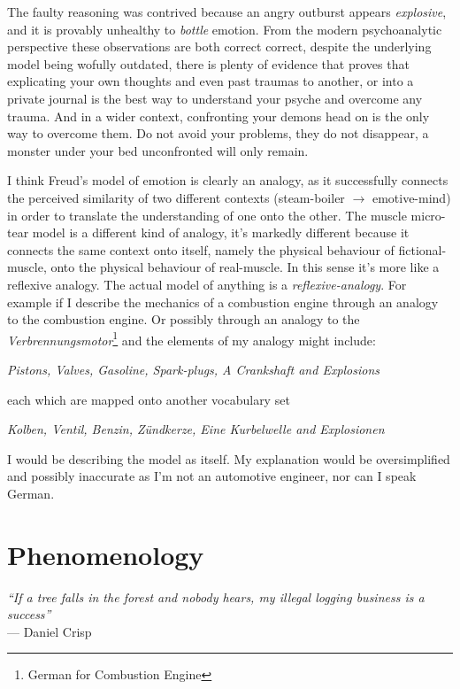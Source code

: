 The faulty reasoning was contrived because an angry outburst appears \textit{explosive}, and it is provably unhealthy to \textit{bottle} emotion. From the modern psychoanalytic perspective these observations are both correct correct, despite the underlying model being wofully outdated, there is plenty of evidence that proves that explicating your own thoughts and even past traumas to another, or into a private journal is the best way to understand your psyche and overcome any trauma. And in a wider context, confronting your demons head on is the only way to overcome them. Do not avoid your problems, they do not disappear, a monster under your bed unconfronted will only remain.

I think Freud's model of emotion is clearly an analogy, as it successfully connects the perceived similarity of two different contexts (steam-boiler $\rightarrow$ emotive-mind) in order to translate the understanding of one onto the other. The muscle micro-tear model is a different kind of analogy, it's markedly different because it connects the same context onto itself, namely the physical behaviour of fictional-muscle, onto the physical behaviour of real-muscle. In this sense it's more like a reflexive analogy. The actual model of anything is a \textit{reflexive-analogy}. For example if I describe the mechanics of a combustion engine through an analogy to the combustion engine. Or possibly through an analogy to the \textit{Verbrennungsmotor}\footnote{German for Combustion Engine} and the elements of my analogy might include:

\begin{center}
\textit{Pistons, Valves, Gasoline, Spark-plugs, A Crankshaft and Explosions}
\end{center}

each which are mapped onto another vocabulary set 

\begin{center}
\textit{Kolben, Ventil, Benzin, Zündkerze, Eine Kurbelwelle and Explosionen}
\end{center}

I would be describing the model as itself. My explanation would be oversimplified and possibly inaccurate as I'm not an automotive engineer, nor can I speak German.


\newpage
\section{Phenomenology}

\begin{center}
\textit{``If a tree falls in the forest and nobody hears, my illegal logging business is a success''}
\\ --- Daniel Crisp
\end{center}

